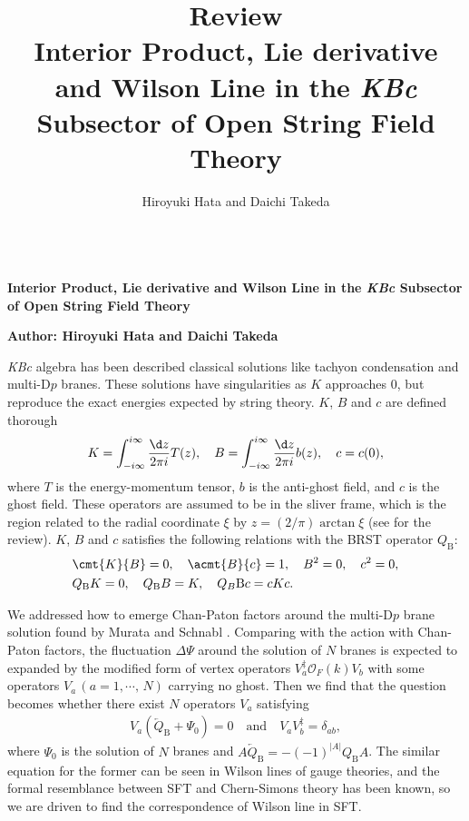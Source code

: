 \documentclass[12pt]{article}
\title{\textbf{Review}\\
Interior Product, Lie derivative and Wilson Line in the \textit{KBc} Subsector of Open String Field Theory
}
\author{Hiroyuki Hata and Daichi Takeda}
\date{}
\begin{document}
{\Large{}\\[2mm]
\textbf{Interior Product, Lie derivative and Wilson Line in the \textit{KBc} Subsector of Open String Field Theory
}
}

\noindent
\textbf{Author: Hiroyuki Hata and Daichi Takeda}

\vspace{12pt}
\textit{KBc} algebra has been described classical solutions like tachyon condensation and multi-$\mathrm{D}p$ branes.
These solutions have singularities as $K$ approaches $0$, but reproduce the exact energies expected by string theory.
$K$, $B$ and $c$ are defined thorough
\begin{align}
	K = \int_{-i\infty}^{i\infty}\frac{\d z}{2\pi i}T(z),\quad
	B =  \int_{-i\infty}^{i\infty}\frac{\d z}{2\pi i}b(z),\quad 
	c = c(0),
\end{align}
where $T$ is the energy-momentum tensor, $b$ is the anti-ghost field, and $c$ is the ghost field.
These operators are assumed to be in the sliver frame, which is the region related to the radial coordinate $\xi$ by $z = (2/\pi)\arctan \xi$ (see \cite{Okawa:2012ica} for the review).
$K$, $B$ and $c$ satisfies the following relations with the BRST operator $Q_\mathrm{B}$:
\begin{align}
	&\cmt{K}{B} = 0,\quad
	\acmt{B}{c} = 1,\quad
	B^2 = 0,\quad
	c^2 = 0,\\
	&Q_\mathrm{B}K = 0,\quad
	Q_\mathrm{B}B = K,\quad
	Q_B\mathrm{B}c = cKc.
\end{align}

We addressed how to emerge Chan-Paton factors around the multi-$\mathrm{D}p$ brane solution found by Murata and Schnabl \cite{Murata:2011ex}.
Comparing with the action with Chan-Paton factors, the fluctuation $\Delta\Psi$ around the solution of $N$ branes is expected to expanded by the modified form of vertex operators $V_a^\ddag\mathcal O_F(k) V_b$  with some operators $V_a\,(a = 1,\cdots,\,N)$ carrying no ghost.
Then we find that the question becomes whether there exist $N$ operators $V_a$ satisfying
\begin{align}
	V_a(\overleftarrow Q_\mathrm{B}+\Psi_0) = 0\quad
	\mathrm{and}\quad 
	V_aV_b^\ddag = \delta_{ab},\label{eq:Va_coditions}
\end{align}
where $\Psi_0$ is the solution of $N$ branes and $A\overleftarrow Q_\mathrm{B} = -(-1)^{|A|}Q_\mathrm{B}A$.
The similar equation for the former can be seen in Wilson lines of gauge theories, and the formal resemblance between SFT and Chern-Simons theory has been known,
so we are driven to find the correspondence of Wilson line in SFT.
\end{document}

